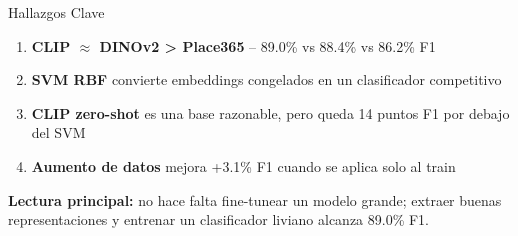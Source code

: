 \documentclass[aspectratio=169]{beamer}
\begin{document}
\begin{frame}{Hallazgos Clave}
\begin{enumerate}
\item \textbf{CLIP $\approx$ DINOv2 > Place365} -- 89.0\% vs 88.4\% vs 86.2\% F1
\item \textbf{SVM RBF} convierte embeddings congelados en un clasificador competitivo
\item \textbf{CLIP zero-shot} es una base razonable, pero queda 14 puntos F1 por debajo del SVM
\item \textbf{Aumento de datos} mejora +3.1\% F1 cuando se aplica solo al train
\end{enumerate}

\vspace{0.5cm}
\textbf{Lectura principal:} no hace falta fine-tunear un modelo grande; extraer buenas representaciones y entrenar un clasificador liviano alcanza 89.0\% F1.
\end{frame}
\end{document}
